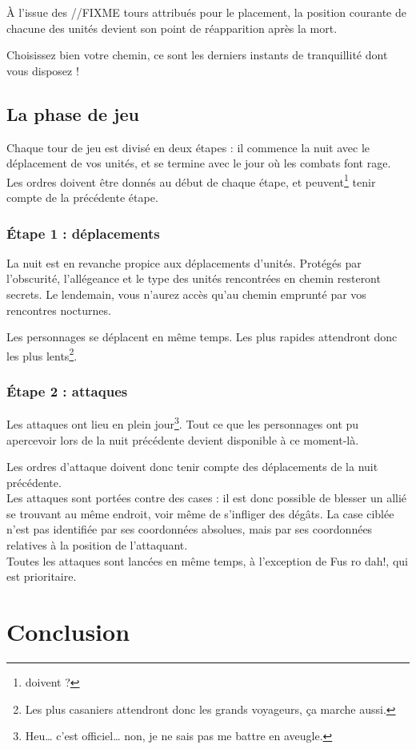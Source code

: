 À l'issue des //FIXME tours attribués pour le placement, la position
courante de chacune des unités devient son point de réapparition après
la mort.

Choisissez bien votre chemin, ce sont les derniers instants de
tranquillité dont vous disposez !

\subsection{La phase de jeu}
Chaque tour de jeu est divisé en deux étapes : il commence la nuit
avec le déplacement de vos unités, et se termine avec le jour où les
combats font rage. Les ordres doivent être donnés au début de chaque
étape, et peuvent\footnote{doivent ?} tenir compte de la précédente
étape.

\subsubsection{Étape 1 : déplacements}

La nuit est en revanche propice aux déplacements d'unités. Protégés par
l'obscurité, l'allégeance et le type des unités rencontrées en chemin
resteront secrets. Le lendemain, vous n'aurez accès qu'au chemin
emprunté par vos rencontres nocturnes.

Les personnages se déplacent en même temps. Les plus rapides
attendront donc les plus lents\footnote{Les plus casaniers attendront
  donc les grands voyageurs, ça marche aussi.}.

\subsubsection{Étape 2 : attaques}

Les attaques ont lieu en plein jour\footnote{\og{}Heu\ldots{} c'est
  officiel\ldots{} non, je ne sais pas me battre en aveugle.\fg{}}. Tout ce que les personnages ont
pu apercevoir lors de la nuit précédente devient disponible à ce moment-là.

Les ordres d'attaque doivent donc tenir compte des déplacements de la
nuit précédente.\\

Les attaques sont portées contre des cases : il est donc possible de
blesser un allié se trouvant au même endroit, voir même de s'infliger
des dégâts. La case ciblée n'est pas identifiée par ses coordonnées
absolues, mais par ses coordonnées relatives à la position de l'attaquant.\\

Toutes les attaques sont lancées en même temps, à l'exception de Fus
ro dah!, qui est prioritaire.

\newpage
\section{Conclusion}

